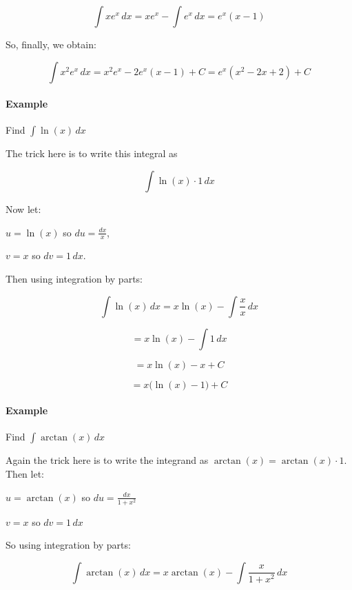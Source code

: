 $$\int x e^x \, dx = x e^x - \int e^x \, dx = e^x (x - 1)$$



So, finally, we obtain:



$$\int x^2 e^x \, dx = x^2 e^x - 2e^x(x - 1) + C = e^x(x^2 - 2x + 2) + C$$



\paragraph{Example}



Find $\int \ln(x) \, dx$



The trick here is to write this integral as



$$\int \ln(x) \cdot 1 \, dx$$



Now let:  

$u = \ln(x)$ so $du = \frac{dx}{x}$,  

$v = x$ so $dv = 1 \, dx$.



Then using integration by parts:



$$\int \ln(x) \, dx = x \ln(x) - \int \frac{x}{x} \, dx$$  

$$= x \ln(x) - \int 1 \, dx$$  

$$= x \ln(x) - x + C$$  

$$= x\bigl(\ln(x) - 1\bigr) + C$$



\paragraph{Example}



Find $\int \arctan(x) \, dx$



Again the trick here is to write the integrand as $\arctan(x) = \arctan(x) \cdot 1$. Then let:  

$u = \arctan(x)$ so $du = \frac{dx}{1 + x^2}$  

$v = x$ so $dv = 1 \, dx$



So using integration by parts:



$$\int \arctan(x) \, dx = x \arctan(x) - \int \frac{x}{1 + x^2} \, dx$$  

